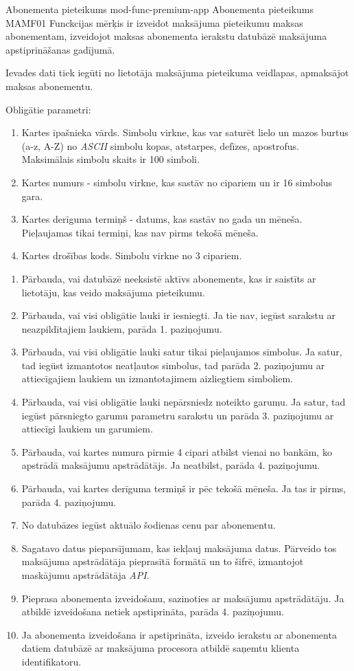 \moduleFunctionTable
{Abonementa pieteikums}
{mod-func-premium-app}
{Abonementa pieteikums}
{MAMF01}
{
	Funckcijas mērķis ir izveidot maksājuma pieteikumu maksas abonementam, izveidojot maksas abonementa ierakstu datubāzē maksājuma apstiprināšanas gadījumā.
}
{
	Ievades dati tiek iegūti no lietotāja maksājuma pieteikuma veidlapas, apmaksājot maksas abonementu.

	Obligātie parametri:
	\begin{enumerate}
		\item Kartes īpašnieka vārds.
		      Simbolu virkne, kas var saturēt lielo un mazos burtus (a-z, A-Z) no \emph{ASCII} simbolu kopas, atstarpes, defīzes, apostrofus.
		      Maksimālais simbolu skaits ir 100 simboli.
		\item Kartes numurs - simbolu virkne, kas sastāv no cipariem un ir 16 simbolus gara.
		\item Kartes derīguma termiņš - datums, kas sastāv no gada un mēneša.
		      Pieļaujamas tikai termiņi, kas nav pirms tekošā mēneša.
		\item Kartes drošības kods.
		      Simbolu virkne no 3 cipariem.
	\end{enumerate}
}
{
	\begin{enumerate}
		\item Pārbauda, vai datubāzē neeksistē aktīvs abonements, kas ir saistīts ar lietotāju, kas veido maksājuma pieteikumu.
		\item Pārbauda, vai visi obligātie lauki ir iesniegti.
		      Ja tie nav, iegūst sarakstu ar neazpildītajiem laukiem, parāda 1. paziņojumu.
		\item Pārbauda, vai visi obligātie lauki satur tikai pieļaujamos simbolus.
		      Ja satur, tad iegūst izmantotos neatļautos simbolus, tad parāda 2. paziņojumu ar attiecīgajiem laukiem un izmantotajimem aizliegtiem simboliem.
		\item Pārbauda, vai visi obligātie lauki nepārsniedz noteikto garumu.
		      Ja satur, tad iegūst pārsniegto garumu parametru sarakstu un parāda 3. paziņojumu ar attiecīgi laukiem un garumiem.
		\item Pārbauda, vai kartes numura pirmie 4 cipari atbilst vienai no bankām, ko apstrādā maksājumu apstrādātājs.
		      Ja neatbilst, parāda 4. paziņojumu.
		\item Pārbauda, vai kartes derīguma termiņš ir pēc tekošā mēneša.
		      Ja tas ir pirms, parāda 4. paziņojumu.
		\item No datubāzes iegūst aktuālo šodienas cenu par abonementu.
		\item Sagatavo datus pieparsījumam, kas iekļauj maksājuma datus.
		      Pārveido tos maksājuma apstrādātāja pieprasītā formātā un to šifrē, izmantojot maskājumu apstrādātāja \emph{API}.
		\item Pieprasa abonementa izveidošanu, sazinoties ar maksājumu apstrādātāju.
		      Ja atbildē izveidošana netiek apstiprināta, parāda 4. paziņojumu.
		\item Ja abonementa izveidošana ir apstiprināta, izveido ierakstu ar abonementa datiem datubāzē ar maksājuma procesora atbildē saņemtu klienta identifikatoru.
	\end{enumerate}
}
